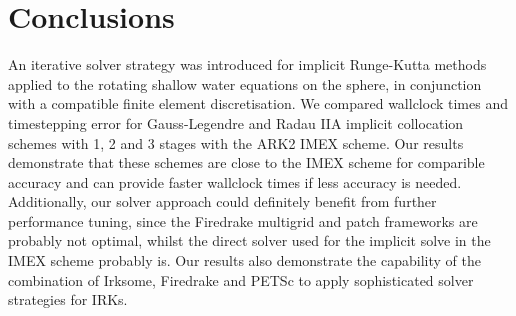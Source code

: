 \documentclass[a4paper, 12pt]{article}
\begin{document}
%
%
%
%
%





 \cleardoublepage


\section{Conclusions}

An iterative solver strategy was introduced for implicit Runge-Kutta
methods applied to the rotating shallow water equations on the sphere,
in conjunction with a compatible finite element discretisation. We
compared wallclock times and timestepping error for Gauss-Legendre and
Radau IIA implicit collocation schemes with 1, 2 and 3 stages with the
ARK2 IMEX scheme. Our results demonstrate that these schemes are close
to the IMEX scheme for comparible accuracy and can provide faster
wallclock times if less accuracy is needed. Additionally, our solver
approach could definitely benefit from further performance tuning, since
the Firedrake multigrid and patch frameworks are probably not optimal,
whilst the direct solver used for the implicit solve in the IMEX
scheme probably is. Our results also demonstrate the capability of
the combination of Irksome, Firedrake and PETSc to apply sophisticated
solver strategies for IRKs.
\end{document}
